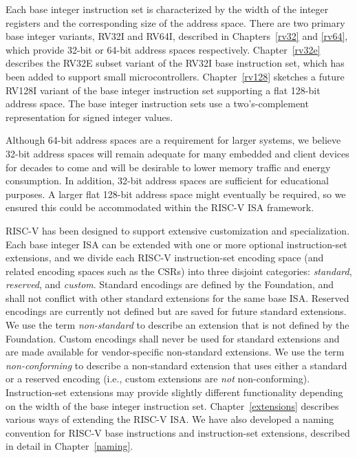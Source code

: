 Each base integer instruction set is characterized by the width of the
integer registers and the corresponding size of the address
space.  There are two primary base integer variants, RV32I and RV64I,
described in Chapters~\ref{rv32} and \ref{rv64}, which provide 32-bit
or 64-bit address spaces respectively.  Chapter~\ref{rv32e}
describes the RV32E subset variant of the RV32I base instruction set,
which has been added to support small microcontrollers.
Chapter~\ref{rv128} sketches a future RV128I variant of the base
integer instruction set supporting a flat 128-bit address space.
The base integer instruction sets use a two's-complement
representation for signed integer values.

\begin{commentary}
Although 64-bit address spaces are a requirement for larger systems,
we believe 32-bit address spaces will remain adequate for many
embedded and client devices for decades to come and will be desirable
to lower memory traffic and energy consumption.  In addition, 32-bit
address spaces are sufficient for educational purposes.  A larger flat
128-bit address space might eventually be required, so we ensured this
could be accommodated within the RISC-V ISA framework.
\end{commentary}

RISC-V has been designed to support extensive customization and
specialization.  Each base integer ISA can be extended with one or
more optional instruction-set extensions, and we divide each RISC-V
instruction-set encoding space (and related encoding spaces such as
the CSRs) into three disjoint categories: {\em standard}, {\em
  reserved}, and {\em custom}.  Standard encodings are defined by the
Foundation, and shall not conflict with other standard extensions for
the same base ISA.  Reserved encodings are currently not defined but
are saved for future standard extensions.  We use the term {\em
  non-standard} to describe an extension that is not defined by the
Foundation.  Custom encodings shall never be used for standard
extensions and are made available for vendor-specific non-standard
extensions.  We use the term {\em non-conforming} to describe a
non-standard extension that uses either a standard or a reserved
encoding (i.e., custom extensions are {\em not} non-conforming).
Instruction-set extensions may provide slightly different
functionality depending on the width of the base integer instruction
set.  Chapter~\ref{extensions} describes various ways of extending the
RISC-V ISA.  We have also developed a naming convention for RISC-V
base instructions and instruction-set extensions, described in detail
in Chapter~\ref{naming}.

